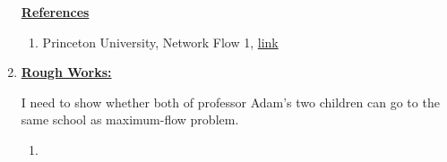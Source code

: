 \documentclass[12pt]{article}
\begin{document}
\begin{enumerate}[1.]
\begin{itemize}
\begin{itemize}
        \end{itemize}
    \end{itemize}

    \bigskip

    \underline{\textbf{References}}

    \bigskip

    \begin{enumerate}[1)]
        \item Princeton University, Network Flow 1, \href{https://www.cs.princeton.edu/~wayne/kleinberg-tardos/pdf/07NetworkFlowI.pdf}{link}
    \end{enumerate}

    \item

    \bigskip

    \underline{\textbf{Rough Works:}}

    \bigskip

    I need to show whether both of professor Adam's two children can go to the same school
    as maximum-flow problem.

    \bigskip

    \begin{enumerate}[1.]
        \item
    \end{enumerate}

\end{enumerate}
\end{document}
